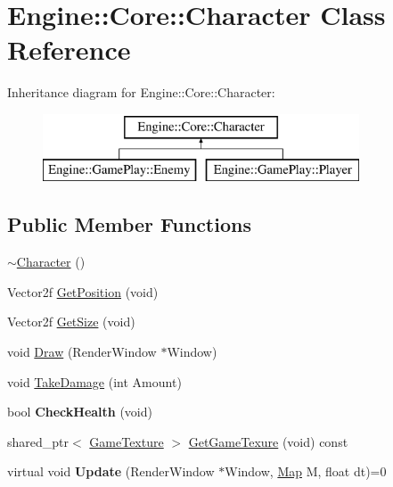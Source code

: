 \hypertarget{class_engine_1_1_core_1_1_character}{}\section{Engine\+:\+:Core\+:\+:Character Class Reference}
\label{class_engine_1_1_core_1_1_character}
Inheritance diagram for Engine\+:\+:Core\+:\+:Character\+:\begin{figure}[H]
\begin{center}
\leavevmode
\includegraphics[height=2.000000cm]{class_engine_1_1_core_1_1_character}
\end{center}
\end{figure}
\subsection*{Public Member Functions}
\begin{DoxyCompactItemize}
\item 
\hyperlink{class_engine_1_1_core_1_1_character_a0377de26714b79374d0591ca44c77fd1}{$\sim$\+Character} ()
\item 
Vector2f \hyperlink{class_engine_1_1_core_1_1_character_aea290308ddc56ab784c87f85e6b7f254}{Get\+Position} (void)
\item 
Vector2f \hyperlink{class_engine_1_1_core_1_1_character_a3465481aed27d24909b8e40577f09b10}{Get\+Size} (void)
\item 
void \hyperlink{class_engine_1_1_core_1_1_character_ae25a76e7497eeb6dbd1ad3b72c1ff721}{Draw} (Render\+Window $\ast$Window)
\item 
void \hyperlink{class_engine_1_1_core_1_1_character_a2156c371584ca6a8d2961154f1b49c09}{Take\+Damage} (int Amount)
\item 
\mbox{\label{class_engine_1_1_core_1_1_character_ad32924505f5bc7761590ecbfd06e6f09}} 
bool {\bfseries Check\+Health} (void)
\item 
shared\+\_\+ptr$<$ \hyperlink{class_engine_1_1_core_1_1_game_texture}{Game\+Texture} $>$ \hyperlink{class_engine_1_1_core_1_1_character_afff37c4ff688837f42509f721853bab8}{Get\+Game\+Texure} (void) const
\item 
\mbox{\label{class_engine_1_1_core_1_1_character_a45c8ef2c736469a3264ee8733305675c}} 
virtual void {\bfseries Update} (Render\+Window $\ast$Window, \hyperlink{class_engine_1_1_core_1_1_map}{Map} M, float dt)=0
\end{DoxyCompactItemize}
